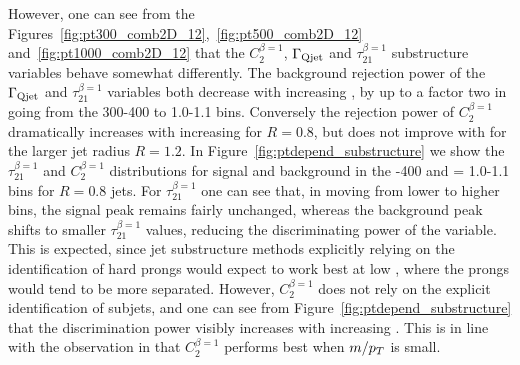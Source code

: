 However, one can see from the Figures~\ref{fig:pt300_comb2D_12},~\ref{fig:pt500_comb2D_12}
and~\ref{fig:pt1000_comb2D_12} that the $C_2^{\beta=1}$, $\Gamma_{\rm Qjet}$ and
$\tau_{21}^{\beta=1}$ substructure variables behave somewhat
differently. The background rejection power of the $\Gamma_{\rm Qjet}$ and
$\tau_{21}^{\beta=1}$ variables both decrease with increasing \pt, by
up to a factor two in going from the 300-400 \GeV to
1.0-1.1 \TeV bins. Conversely the rejection power of $C_2^{\beta=1}$
dramatically increases with increasing \pt for $R=0.8$, but does not
improve with \pt for the larger jet radius $R=1.2$. In Figure~\ref{fig:ptdepend_substructure} we show the
$\tau_{21}^{\beta=1}$ and $C_2^{\beta=1}$ distributions for signal and background in the -400 \GeV and \pt = 1.0-1.1 \TeV bins for $R=0.8$ jets. For
$\tau_{21}^{\beta=1}$ one can see that, in moving from  lower to 
higher \pt bins, the signal peak remains fairly unchanged, whereas the
background peak shifts to smaller $\tau_{21}^{\beta=1}$ values,
reducing the discriminating power of the variable. This is expected,
since jet substructure methods explicitly relying on the identification of hard
prongs would expect to work best at low \pt, where the prongs would
tend to be more separated. However, $C_2^{\beta=1}$ does not rely on
the explicit identification of subjets, and one can see from
Figure~\ref{fig:ptdepend_substructure} that the discrimination power
visibly increases with increasing \pt. This is in line with the
observation in \cite{Larkoski:2013eya} that $C_2^{\beta=1}$ performs best when $m/p_T$ is small.

